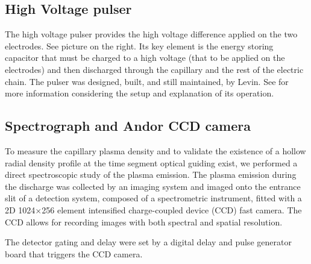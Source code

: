 \documentclass[justified,nofonts,nobib]{tufte-book}
\begin{document}
\subsection{High Voltage pulser}
The high voltage pulser provides the high voltage difference applied on the two electrodes. See picture on the right. Its key element is the energy storing capacitor that must be charged to a high voltage (that to be applied on the electrodes) and then discharged through the capillary and the rest of the electric chain. The pulser was designed, built, and still maintained, by Levin. See \cite{Levin2009ExcitationAcceleration, pp. 46-47} for more information considering the setup and explanation of its operation.
	
\subsection{Spectrograph and Andor CCD camera}\label{ssec:spectro}
To measure the capillary plasma density and to validate the existence of a hollow radial density profile at the time segment optical guiding exist, we performed a direct spectroscopic study of the plasma emission. The plasma emission during the discharge was collected by an imaging system and imaged onto the entrance slit of a detection system, composed of a spectrometric instrument, fitted with a 2D 1024$\times$256 element intensified charge-coupled device (CCD) fast camera. The CCD allows for recording images with both spectral and spatial resolution.

The detector gating and delay were set by a digital delay and pulse generator board that triggers the CCD camera.
\end{document}
